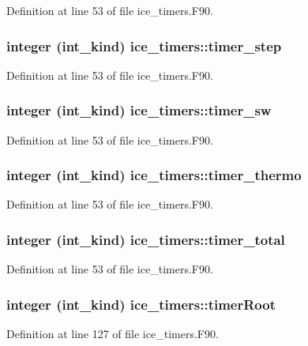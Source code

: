 Definition at line 53 of file ice\_\-timers.F90.\hypertarget{namespaceice__timers_a2f62f4afeed2dc2700a9bf7c15e6d746}{
\subsubsection[{timer\_\-step}]{\setlength{\rightskip}{0pt plus 5cm}integer (int\_\-kind) {\bf ice\_\-timers::timer\_\-step}}}
\label{namespaceice__timers_a2f62f4afeed2dc2700a9bf7c15e6d746}


Definition at line 53 of file ice\_\-timers.F90.\hypertarget{namespaceice__timers_a6fd87221d7d148cbbd9b6c885a235034}{
\subsubsection[{timer\_\-sw}]{\setlength{\rightskip}{0pt plus 5cm}integer (int\_\-kind) {\bf ice\_\-timers::timer\_\-sw}}}
\label{namespaceice__timers_a6fd87221d7d148cbbd9b6c885a235034}


Definition at line 53 of file ice\_\-timers.F90.\hypertarget{namespaceice__timers_af9a7c2e62659a0c8babe31eeb749aabd}{
\subsubsection[{timer\_\-thermo}]{\setlength{\rightskip}{0pt plus 5cm}integer (int\_\-kind) {\bf ice\_\-timers::timer\_\-thermo}}}
\label{namespaceice__timers_af9a7c2e62659a0c8babe31eeb749aabd}


Definition at line 53 of file ice\_\-timers.F90.\hypertarget{namespaceice__timers_af4544096584c21d56bb41d500d4a1e7b}{
\subsubsection[{timer\_\-total}]{\setlength{\rightskip}{0pt plus 5cm}integer (int\_\-kind) {\bf ice\_\-timers::timer\_\-total}}}
\label{namespaceice__timers_af4544096584c21d56bb41d500d4a1e7b}


Definition at line 53 of file ice\_\-timers.F90.\hypertarget{namespaceice__timers_a1659ba1f7b638e76d301c36b9b061f85}{
\subsubsection[{timerRoot}]{\setlength{\rightskip}{0pt plus 5cm}integer (int\_\-kind) {\bf ice\_\-timers::timerRoot}}}
\label{namespaceice__timers_a1659ba1f7b638e76d301c36b9b061f85}


Definition at line 127 of file ice\_\-timers.F90.
